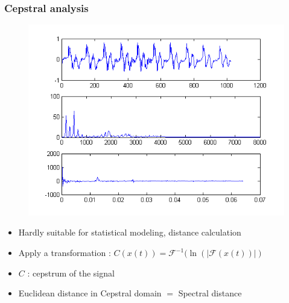 \documentclass[11pt,english]{beamer}
\begin{document}
\begin{frame}
  \frametitle{Cepstral analysis}
    \begin{figure}
    \centering
    \includegraphics[trim={0 7.2cm 0 0}, clip, scale = 0.8]{cepstre.png}
    \end{figure}
      
    \begin{itemize}
    \item Hardly suitable for statistical modeling, distance calculation
    \item Apply a transformation :
    $ C(x(t)) = \mathcal{F}^{-1}(\ln(|\mathcal{F}(x(t))|)  $
    \item $C$ : cepstrum of the signal
    \item Euclidean distance in Cepstral domain $=$ Spectral distance 
    \end{itemize}
  \end{frame}
\end{document}
